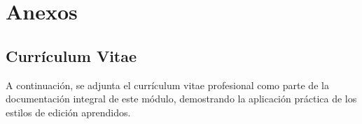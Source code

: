 \documentclass[runningheads]{llncs}
\begin{document}
\section{Anexos}

\subsection{Currículum Vitae}
A continuación, se adjunta el currículum vitae profesional como parte de la documentación integral de este módulo, demostrando la aplicación práctica de los estilos de edición aprendidos.



%
%
%
% 
% 
%
 
\end{document}
